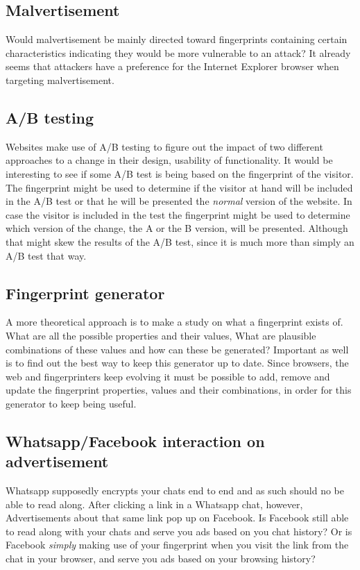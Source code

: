 \subsection{Malvertisement}

Would malvertisement be mainly directed toward
fingerprints containing certain characteristics
indicating they would be more vulnerable to an attack?
It already seems that attackers have a preference
for the Internet Explorer browser
when targeting malvertisement.
\cite{li2012knowing}

\subsection{A/B testing}
Websites make use of A/B testing to figure out the impact
of two different approaches to a change
in their design, usability of functionality.
It would be interesting to see if some A/B test
is being based on the fingerprint of the visitor.
The fingerprint might be used to determine
if the visitor at hand will be included in the A/B test
or that he will be presented the \textit{normal} version of the website.
In case the visitor is included in the test
the fingerprint might be used to determine which version of the change,
the A or the B version, will be presented.
Although that might skew the results of the A/B test,
since it is much more than simply an A/B test that way.

\subsection{Fingerprint generator}
A more theoretical approach is to make a study on what a fingerprint exists of.
What are all the possible properties and their values,
What are plausible combinations of these values
and how can these be generated?
Important as well is to find out the best way
to keep this generator up to date.
Since browsers, the web and fingerprinters keep evolving
it must be possible to add, remove and update
the fingerprint properties, values and their combinations,
in order for this generator to keep being useful.

\subsection{Whatsapp/Facebook interaction on advertisement}
Whatsapp supposedly encrypts your chats end to end
and as such should no be able to read along.
After clicking a link in a Whatsapp chat, however,
Advertisements about that same link pop up on Facebook.
Is Facebook still able to read along with your chats
and serve you ads based on you chat history?
Or is Facebook \textit{simply} making use of your fingerprint
when you visit the link from the chat in your browser,
and serve you ads based on your browsing history?

